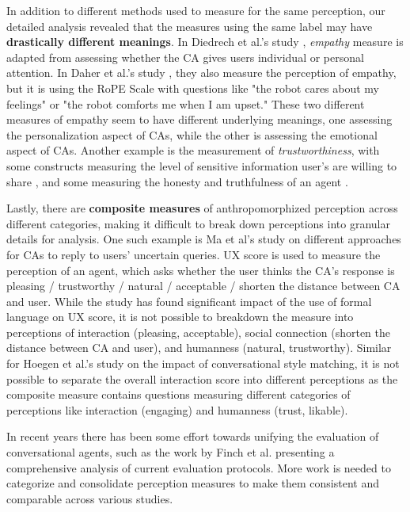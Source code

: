 \documentclass[sigconf,screen,review, anonymous]{acmart}
\newcommand{\cmt}[1]{}%
\begin{document}
 In addition to different methods used to measure for the same perception, our detailed analysis revealed that the measures using the same label may have \textbf{drastically different meanings}. In Diedrech et al.'s study \cite{diederich2019emulating}\cmt{[25]}, \textit{empathy} measure is adapted from \cite{yan2013role} assessing whether the CA gives users individual or personal attention. In Daher et al.'s study \cite{daher2020empathic}\cmt{[58]}, they also measure the perception of empathy, but it is using the RoPE Scale \cite{charrier2019rope} with questions like "the robot cares about my feelings" or "the robot comforts me when I am upset." These two different measures of empathy seem to have different underlying meanings, one assessing the personalization aspect of CAs, while the other is assessing the emotional aspect of CAs. Another example is the measurement of \textit{trustworthiness}, with some constructs measuring the level of sensitive information user's are willing to share \cite{dinev2006privacy}, and some measuring the honesty and truthfulness of an agent \cite{lee2017enhancing}. 

Lastly, there are \textbf{composite measures} of anthropomorphized perception across different categories, making it difficult to break down perceptions into granular details for analysis. One such example is Ma et al's study \cite{ma2022ask}\cmt{[29]} on different approaches for CAs to reply to users' uncertain queries. UX score is used to measure the perception of an agent, which asks whether the user thinks the CA's response is pleasing / trustworthy / natural / acceptable / shorten the distance between CA and user. While the study has found significant impact of the use of formal language on UX score, it is not possible to breakdown the measure into perceptions of interaction (pleasing, acceptable), social connection (shorten the distance between CA and user), and humanness (natural, trustworthy). Similar for Hoegen et al.'s study \cite{hoegen2019end}\cmt{[31]} on the impact of conversational style matching, it is not possible to separate the overall interaction score into different perceptions as the composite measure contains questions measuring different categories of perceptions like interaction (engaging) and humanness (trust, likable).

In recent years there has been some effort towards unifying the evaluation of conversational agents, such as the work by Finch et al. \cite{finch2020towards} presenting a comprehensive analysis of current evaluation protocols. More work is needed to categorize and consolidate perception measures to make them consistent and comparable across various studies. 
\end{document}
